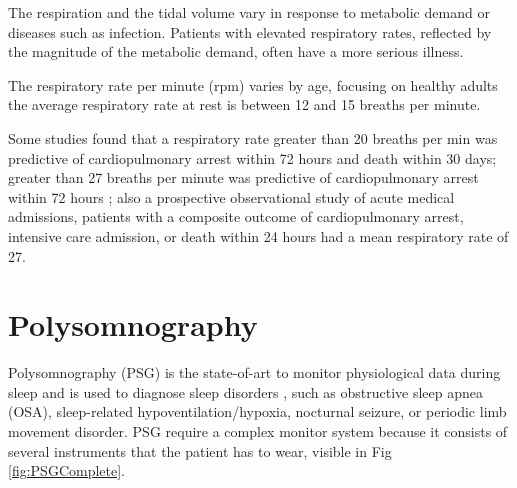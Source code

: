 The respiration and the tidal volume vary in response to metabolic demand or diseases such as infection. Patients with elevated respiratory rates, reflected by the magnitude of the metabolic demand, often have a more serious illness. 

The respiratory rate per minute (rpm) varies by age, focusing on healthy adults the average respiratory rate at rest is between 12 and 15 breaths per minute\cite{barrett2010ganong}.

Some studies found that a respiratory rate greater than 20 breaths per min was predictive of cardiopulmonary arrest within 72 hours and death within 30 days\cite{Hong2013HowPatients}; greater than 27 breaths per minute was predictive of cardiopulmonary arrest within 72 hours \cite{Fieselmann1993RespiratoryInpatients}; also a prospective observational study of acute medical admissions, patients with a composite outcome of cardiopulmonary arrest, intensive care admission, or death within 24 hours had a mean respiratory rate of 27\cite{Subbe2003EffectAdmissions}.


\section{Polysomnography}

Polysomnography (PSG) is the state-of-art to monitor physiological data during sleep and is used to diagnose sleep disorders \cite{Penzel2016ModulationsPolysomnography, RUNDO2019381}, such as obstructive sleep apnea (OSA), sleep-related hypoventilation/hypoxia, nocturnal seizure, or periodic limb movement disorder. PSG require a complex monitor system because it consists of several instruments that the patient has to wear, visible in Fig \ref{fig:PSGComplete}.

